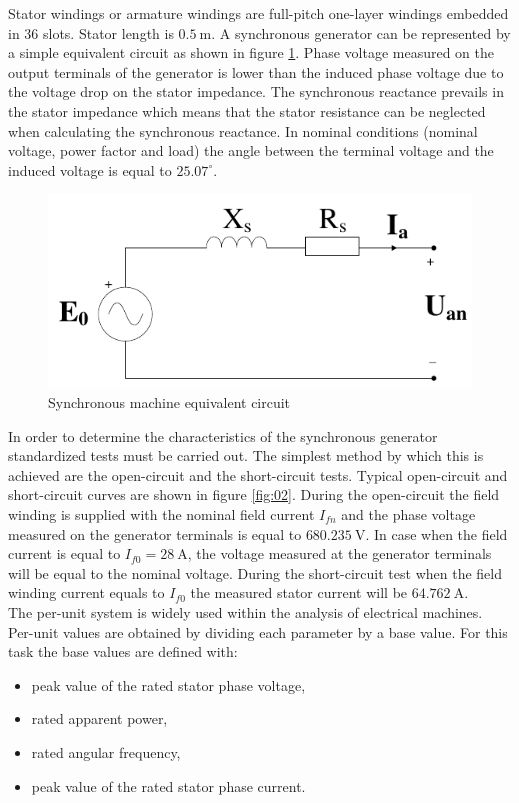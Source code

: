 \documentclass{article}
\begin{document}
Stator windings or armature windings are full-pitch one-layer windings embedded in 36 slots. Stator length is $0.5\ \mathrm{m}$. A synchronous generator can be represented by a simple equivalent circuit as shown in figure \ref{fig:01}. Phase voltage measured on the output terminals of the generator is lower than the induced phase voltage due to the voltage drop on the stator impedance. The synchronous reactance prevails in the stator impedance which means that the stator resistance can be neglected when calculating the synchronous reactance. In nominal conditions (nominal voltage, power factor and load) the angle between the terminal voltage and the induced voltage is equal to $25.07^{\circ}$.
\begin{figure}[!htb]
			\centering
			\includegraphics{Images/EquivalentCircuit.pdf}
			\caption{Synchronous machine equivalent circuit}
			\label{fig:01}
\end{figure}
In order to determine the characteristics of the synchronous generator standardized tests must be carried out. The simplest method by which this is achieved are the open-circuit and the short-circuit tests. Typical open-circuit and short-circuit curves are shown in figure \ref{fig:02}. During the open-circuit the field winding is supplied with the nominal field current $I_{fn}$ and the phase voltage measured on the generator terminals is equal to $680.235\ \mathrm{V}$. In case when the field current is equal to $I_{f0} = 28 \ \mathrm{A}$, the voltage measured at the generator terminals will be equal to the nominal voltage. During the short-circuit test when the field winding current equals to $I_{f0}$ the measured stator current will be $64.762\ \mathrm{A}$. 
\\The per-unit system is widely used within the analysis of electrical machines. Per-unit values are obtained by dividing each parameter by a base value. For this task the base values are defined with:
\begin{itemize}
    \item peak value of the rated stator phase voltage,
    \item rated apparent power,
    \item rated angular frequency,
    \item peak value of the rated stator phase current.
\end{itemize}
\end{document}
